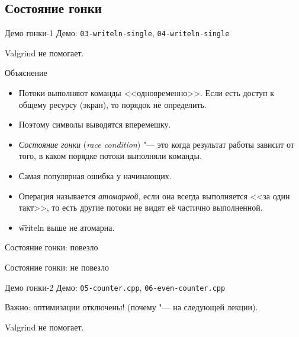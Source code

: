 \subsection{Состояние гонки}

\begin{frame}
\end{frame}

\begin{frame}{Демо гонки-1}
	Демо: \texttt{03-writeln-single}, \texttt{04-writeln-single}

	Valgrind не помогает.
\end{frame}

\begin{frame}{Объяснение}
	\begin{itemize}
		\item
			Потоки выполняют команды <<одновременно>>.
			Если есть доступ к общему ресурсу (экран), то порядок не определить.
		\item
			Поэтому символы выводятся вперемешку.
		\item
			\textit{Состояние гонки} (\textit{race condition}) "--- это когда результат работы зависит от того, в каком порядке потоки выполняли команды.
		\item
			Самая популярная ошибка у начинающих.
		\item
			Операция называется \textit{атомарной}, если она всегда выполняется <<за один такт>>,
			то есть другие потоки не видят её частично выполненной.
		\item
			\t{writeln} выше не атомарна.
	\end{itemize}
\end{frame}

\begin{frame}{Состояние гонки: повезло}
\end{frame}

\begin{frame}{Состояние гонки: не повезло}
\end{frame}

\begin{frame}{Демо гонки-2}
	Демо: \texttt{05-counter.cpp}, \texttt{06-even-counter.cpp}

	Важно: оптимизации отключены! (почему "--- на следующей лекции).

	Valgrind не помогает.
\end{frame}

